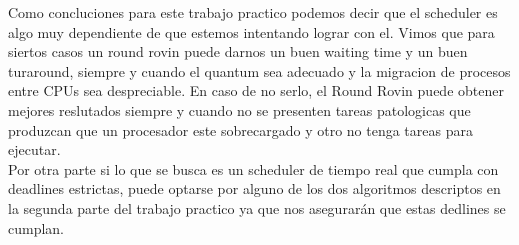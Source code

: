 Como concluciones para este trabajo practico podemos decir que el scheduler es algo muy dependiente de que estemos intentando lograr con el. Vimos que para siertos casos un round rovin puede darnos un buen waiting time y un buen turaround, siempre y cuando el quantum sea adecuado y la migracion de procesos entre CPUs sea despreciable. En caso de no serlo, el Round Rovin puede obtener mejores reslutados siempre y cuando no se presenten tareas patologicas que produzcan que un procesador este sobrecargado y otro no tenga tareas para ejecutar.
\\
Por otra parte si lo que se busca es un scheduler de tiempo real que cumpla con deadlines estrictas, puede optarse por alguno de los dos algoritmos descriptos en la segunda parte del trabajo practico ya que nos asegurarán que estas dedlines se cumplan.